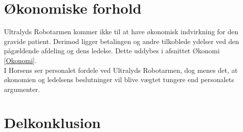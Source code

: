 \section{Økonomiske forhold}
Ultralyds Robotarmen kommer ikke til at have økonomisk indvirkning for den gravide patient. Derimod ligger betalingen og andre tilkoblede ydelser ved den pågældende afdeling og dens ledelse. Dette uddybes i afsnittet Økonomi \ref{Okonomi}. \\
I Horsens ser personalet fordele ved Ultralyds Robotarmen, dog menes det, at økonomien og ledelsens beslutninger vil blive vægtet tungere end personalets argumenter.  
 
\section{Delkonklusion }